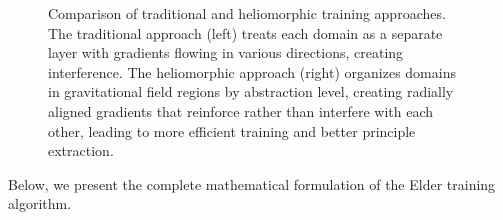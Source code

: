 \begin{figure}[h]
\caption{Comparison of traditional and heliomorphic training approaches. The traditional approach (left) treats each domain as a separate layer with gradients flowing in various directions, creating interference. The heliomorphic approach (right) organizes domains in gravitational field regions by abstraction level, creating radially aligned gradients that reinforce rather than interfere with each other, leading to more efficient training and better principle extraction.}
\label{fig:training_comparison}
\end{figure}

Below, we present the complete mathematical formulation of the Elder training algorithm.

